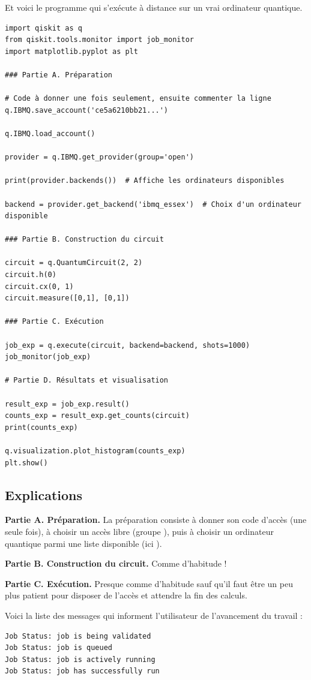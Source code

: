 \documentclass[11pt,class=report,crop=false]{standalone}
\begin{document}
Et voici le programme qui s'exécute à distance sur un vrai ordinateur quantique.
\begin{lstlisting}
import qiskit as q
from qiskit.tools.monitor import job_monitor
import matplotlib.pyplot as plt

### Partie A. Préparation

# Code à donner une fois seulement, ensuite commenter la ligne
q.IBMQ.save_account('ce5a6210bb21...')

q.IBMQ.load_account()

provider = q.IBMQ.get_provider(group='open')

print(provider.backends())  # Affiche les ordinateurs disponibles

backend = provider.get_backend('ibmq_essex')  # Choix d'un ordinateur disponible

### Partie B. Construction du circuit

circuit = q.QuantumCircuit(2, 2)
circuit.h(0)
circuit.cx(0, 1)
circuit.measure([0,1], [0,1])

### Partie C. Exécution 

job_exp = q.execute(circuit, backend=backend, shots=1000)
job_monitor(job_exp)

# Partie D. Résultats et visualisation

result_exp = job_exp.result()
counts_exp = result_exp.get_counts(circuit)
print(counts_exp)

q.visualization.plot_histogram(counts_exp)
plt.show()
\end{lstlisting}


\subsection{Explications}

\textbf{Partie A. Préparation.} La préparation consiste à donner son code d'accès (une seule fois), à choisir un accès libre (groupe ), puis à choisir un ordinateur quantique parmi une liste disponible (ici ).

\textbf{Partie B. Construction du circuit.} Comme d'habitude !

\textbf{Partie C. Exécution.} Presque comme d'habitude sauf qu'il faut être un peu plus patient pour disposer de l'accès et attendre la fin des calculs.

Voici la liste des messages qui informent l'utilisateur de l'avancement du travail :
\begin{lstlisting}
Job Status: job is being validated
Job Status: job is queued
Job Status: job is actively running
Job Status: job has successfully run
\end{lstlisting}
\end{document}
